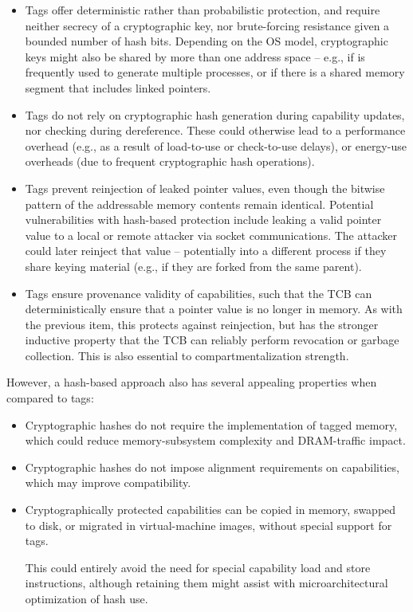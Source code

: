 \begin{itemize}
\item Tags offer deterministic rather than probabilistic protection,
  and require neither secrecy of a cryptographic key, nor brute-forcing resistance given a
  bounded number of hash bits.
  Depending on the OS model, cryptographic keys might also be shared by more
  than one address space -- e.g., if  is frequently used to
  generate multiple processes, or if there is a shared memory segment that
  includes linked pointers.

\item Tags do not rely on cryptographic hash generation during capability
  updates, nor checking during dereference.
  These could otherwise lead to a performance overhead (e.g., as a result of
  load-to-use or check-to-use delays), or energy-use overheads (due to
  frequent cryptographic hash operations).

\item Tags prevent reinjection of leaked pointer values, even though the
  bitwise pattern of the addressable memory contents remain identical.
  Potential vulnerabilities with hash-based protection include leaking a valid
  pointer value to a local or remote attacker via socket communications.
  The attacker could later reinject that value -- potentially into a different
  process if they share keying material (e.g., if they are forked from the
  same parent).

\item Tags ensure provenance validity of capabilities, such that the TCB can
  deterministically ensure that a pointer value is no longer in memory.
  As with the previous item, this protects against reinjection, but has the
  stronger inductive property that the TCB can reliably perform revocation or
  garbage collection.
  This is also essential to compartmentalization strength.
\end{itemize}

However, a hash-based approach also has several appealing properties when
compared to tags:

\begin{itemize}
\item Cryptographic hashes do not require the implementation of tagged memory,
  which could reduce memory-subsystem complexity and DRAM-traffic impact.

\item Cryptographic hashes do not impose alignment requirements on
  capabilities, which may improve compatibility.

\item Cryptographically protected capabilities can be copied in memory,
  swapped to disk, or migrated in virtual-machine images, without special
  support for tags.

  This could entirely avoid the need for special capability load and store
  instructions, although retaining them might assist with microarchitectural
  optimization of hash use.
\end{itemize}

